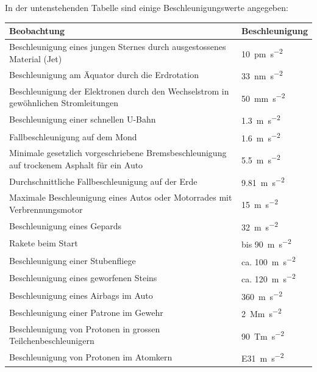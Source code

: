 In der untenstehenden Tabelle sind einige Beschleunigungswerte angegeben:
\begin{table}
\begin{longtable}{@{} m{9.5cm} m{2.5cm}  @{}}
\toprule
Beobachtung & Beschleunigung  \\
\midrule
Beschleunigung eines jungen Sternes durch ausgestossenes Material (Jet) & \SI{10}{\pico \metre \per \second \squared} \\
Beschleunigung am Äquator durch die Erdrotation & \SI{33}{\nano \metre \per \second \squared} \\
Beschleunigung der Elektronen durch den Wechselstrom in gewöhnlichen Stromleitungen & \SI{50}{\milli \metre \per \second \squared} \\
Beschleunigung einer schnellen U-Bahn & \SI{1.3}{ \metre \per \second \squared} \\
Fallbeschleunigung auf dem Mond & \SI{1.6}{ \metre \per \second \squared} \\
Minimale gesetzlich vorgeschriebene Bremsbeschleunigung auf trockenem Asphalt für ein Auto & \SI{5.5}{ \metre \per \second \squared} \\
Durchschnittliche Fallbeschleunigung auf der Erde & \SI{9.81}{ \metre \per \second \squared} \\
Maximale Beschleunigung eines Autos oder Motorrades mit Verbrennungsmotor & \SI{15}{ \metre \per \second \squared} \\
Beschleunigung eines Gepards & \SI{32}{ \metre \per \second \squared} \\
Rakete beim Start & bis \SI{90}{ \metre \per \second \squared} \\
Beschleunigung einer Stubenfliege & ca. \SI{100}{ \metre \per \second \squared} \\
Beschleunigung eines geworfenen Steins & ca. \SI{120}{ \metre \per \second \squared} \\
Beschleunigung eines Airbags im Auto & \SI{360}{ \metre \per \second \squared} \\
Beschleunigung einer Patrone im Gewehr & \SI{2}{ \mega \metre \per \second \squared} \\
Beschleunigung von Protonen in grossen Teilchenbeschleunigern & \SI{90}{\tera \metre \per \second \squared} \\
Beschleunigung von Protonen im Atomkern & \SI{E31}{\metre \per \second \squared} \\
\bottomrule
\end{longtable}
\end{table}

